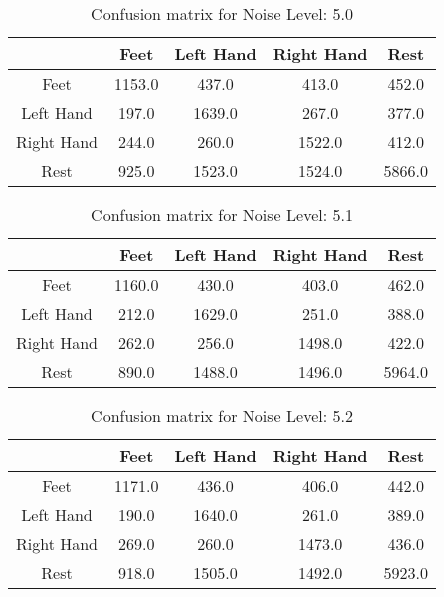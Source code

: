 \begin{table}[!htbp]
    \centering
    \begin{tabular}{|c||c|c|c|c|}
        \hline
		 & Feet & Left Hand & Right Hand & Rest \\
        \hline
        \hline
        Feet & 1153.0 & 437.0 & 413.0 & 452.0 \\
        \hline
        Left Hand & 197.0 & 1639.0 & 267.0 & 377.0 \\
        \hline
        Right Hand & 244.0 & 260.0 & 1522.0 & 412.0 \\
        \hline
        Rest & 925.0 & 1523.0 & 1524.0 & 5866.0 \\
        \hline
    \end{tabular}
    \caption{Confusion matrix for Noise Level: 5.0}
\end{table}

\begin{table}[!htbp]
    \centering
    \begin{tabular}{|c||c|c|c|c|}
        \hline
		 & Feet & Left Hand & Right Hand & Rest \\
        \hline
        \hline
        Feet & 1160.0 & 430.0 & 403.0 & 462.0 \\
        \hline
        Left Hand & 212.0 & 1629.0 & 251.0 & 388.0 \\
        \hline
        Right Hand & 262.0 & 256.0 & 1498.0 & 422.0 \\
        \hline
        Rest & 890.0 & 1488.0 & 1496.0 & 5964.0 \\
        \hline
    \end{tabular}
    \caption{Confusion matrix for Noise Level: 5.1}
\end{table}

\begin{table}[!htbp]
    \centering
    \begin{tabular}{|c||c|c|c|c|}
        \hline
		 & Feet & Left Hand & Right Hand & Rest \\
        \hline
        \hline
        Feet & 1171.0 & 436.0 & 406.0 & 442.0 \\
        \hline
        Left Hand & 190.0 & 1640.0 & 261.0 & 389.0 \\
        \hline
        Right Hand & 269.0 & 260.0 & 1473.0 & 436.0 \\
        \hline
        Rest & 918.0 & 1505.0 & 1492.0 & 5923.0 \\
        \hline
    \end{tabular}
    \caption{Confusion matrix for Noise Level: 5.2}
\end{table}

